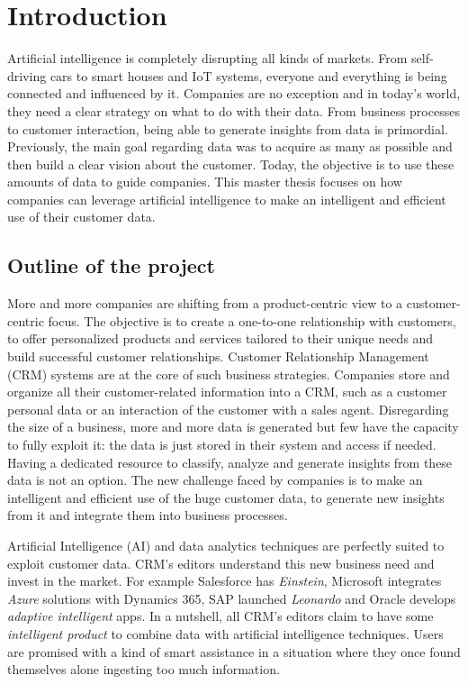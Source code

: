 \chapter{Introduction}

Artificial intelligence is completely disrupting all kinds of markets. From self-driving cars to smart houses and IoT systems, everyone and everything is being connected and influenced by it. Companies are no exception and in today's world, they need a clear strategy on what to do with their data. From business processes to customer interaction, being able to generate insights from data is primordial. Previously, the main goal regarding data was to acquire as many as possible and then build a clear vision about the customer.  Today, the objective is to use these amounts of data to guide companies. This master thesis focuses on how companies can leverage artificial intelligence to make an intelligent and efficient use of their customer data.


\section{Outline of the project}

More and more companies are shifting from a product-centric view to a customer-centric focus. The objective is to create a one-to-one relationship with customers, to offer personalized products and services tailored to their unique needs and build successful customer relationships. Customer Relationship Management (CRM) systems are at the core of such business strategies. Companies store and organize all their customer-related information into a CRM, such as a customer personal data or an interaction of the customer with a sales agent. Disregarding the size of a business, more and more data is generated but few have the capacity to fully exploit it: the data is just stored in their system and access if needed. Having a dedicated resource to classify, analyze and generate insights from these data is not an option. The new challenge faced by companies is to make an intelligent and efficient use of the huge customer data, to generate new insights from it and integrate them into business processes.

Artificial Intelligence (AI) and data analytics techniques are perfectly suited to exploit customer data. CRM's editors understand this new business need and invest in the market. For example Salesforce has \textit{Einstein}, Microsoft integrates \textit{Azure} solutions with Dynamics 365, SAP launched \textit{Leonardo} and Oracle develops \textit{adaptive intelligent} apps. In a nutshell, all CRM's editors claim to have some \textit{intelligent product} to combine data with artificial intelligence techniques. Users are promised with a kind of smart assistance in a situation where they once found themselves alone ingesting too much information. 

